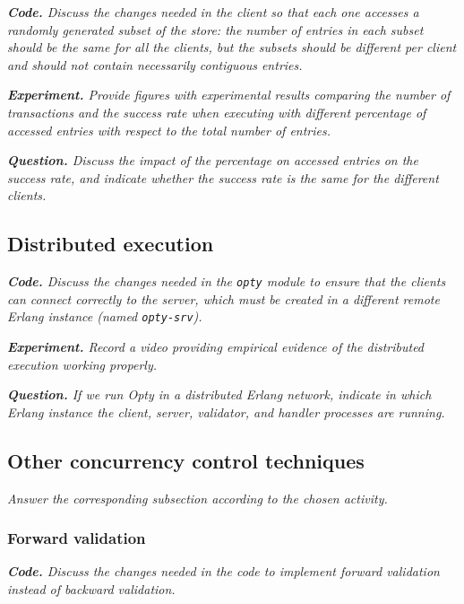 \documentclass[a4paper, 10pt]{article}
\begin{document}
\textit{\textbf{Code.} Discuss the changes needed in the client so that each one accesses a randomly generated subset of the store: the number of entries in each subset should be the same for all the clients, but the subsets should be different per client and should not contain necessarily contiguous entries.}

{\setlength{\parskip}{10pt}\noindent\textit{\textbf{Experiment.} Provide figures with experimental results comparing the number of transactions and the success rate when executing with different percentage of accessed entries with respect to the total number of entries.}}

{\setlength{\parskip}{10pt}\noindent\textit{\textbf{Question.} Discuss the impact of the percentage on accessed entries on the success rate, and indicate whether the success rate is the same for the different clients.}}

\subsection{Distributed execution}

\textit{\textbf{Code.} Discuss the changes needed in the \texttt{opty} module to ensure that the clients can connect correctly to the server, which must be created in a different remote Erlang instance (named \texttt{opty-srv}).}

{\setlength{\parskip}{10pt}\noindent\textit{\textbf{Experiment.} Record a video providing empirical evidence of the distributed execution working properly.}}

{\setlength{\parskip}{10pt}\noindent\textit{\textbf{Question.} If we run Opty in a distributed Erlang network, indicate in which Erlang instance the client, server, validator, and handler processes are running.}}

\subsection{Other concurrency control techniques}

\textit{Answer the corresponding subsection according to the chosen activity.}

\subsubsection{Forward validation}

\textit{\textbf{Code.} Discuss the changes needed in the code to implement forward validation instead of backward validation.}
\end{document}
